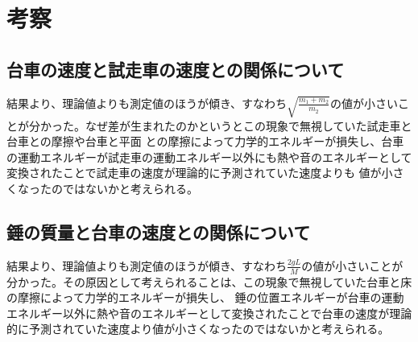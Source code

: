 \documentclass{jlreq}
\begin{document}
\section{考察}
\subsection{台車の速度と試走車の速度との関係について}
結果より、理論値よりも測定値のほうが傾き、すなわち$\sqrt{\frac{m_1+m_2}{m_2}}$の値が小さいことが分かった。なぜ差が生まれたのかというとこの現象で無視していた試走車と台車との摩擦や台車と平面
との摩擦によって力学的エネルギーが損失し、台車の運動エネルギーが試走車の運動エネルギー以外にも熱や音のエネルギーとして変換されたことで試走車の速度が理論的に予測されていた速度よりも
値が小さくなったのではないかと考えられる。
\subsection{錘の質量と台車の速度との関係について}
結果より、理論値よりも測定値のほうが傾き、すなわち$\frac{2gL}{M}$の値が小さいことが分かった。その原因として考えられることは、この現象で無視していた台車と床の摩擦によって力学的エネルギーが損失し、
錘の位置エネルギーが台車の運動エネルギー以外に熱や音のエネルギーとして変換されたことで台車の速度が理論的に予測されていた速度より値が小さくなったのではないかと考えられる。
\end{document}
